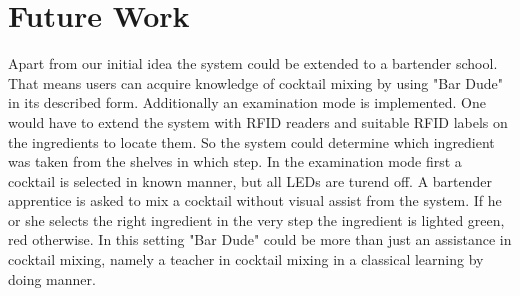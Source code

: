 \documentclass{acm_proc_article-sp}
\begin{document}
\begin{minipage}{\linewidth}%
\label{fig:bar}%
\end{minipage}

\section{Future Work}
Apart from our initial idea the system could be extended to a bartender school. That means users can acquire knowledge of cocktail mixing by using "Bar Dude" in its described form. Additionally an examination mode is implemented. One would have to extend the system with RFID readers and suitable RFID labels on the ingredients to locate them. So the system could determine which ingredient was taken from the shelves in which step. In the examination mode first a cocktail is selected in known manner, but all LEDs are turend off. A bartender apprentice is asked to mix a cocktail without visual assist from the system. If he or she selects the right ingredient in the very step the ingredient is lighted green, red otherwise. In this setting "Bar Dude" could be more than just an assistance in cocktail mixing, namely a teacher in cocktail mixing in a classical learning by doing manner.
\end{document}
